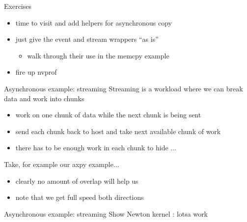 \begin{frame}[fragile]{Exercises}
    \begin{itemize}
        \item time to visit  and add helpers for asynchronous copy
        \item just give the event and stream wrappers ``as is''
        \begin{itemize}
            \item walk through their use in the memcpy example
        \end{itemize}
        \item fire up nvprof
    \end{itemize}
\end{frame}

\begin{frame}[fragile]{Asynchronous example: streaming}
    Streaming is a workload where we can break data and work into chunks
    \begin{itemize}
        \item work on one chunk of data while the next chunk is being sent
        \item send each chunk back to host and take next available chunk of work
        \item there has to be enough work in each chunk to hide ...
    \end{itemize}

    Take, for example our axpy example...
    \begin{itemize}
        \item clearly no amount of overlap will help us
        \item note that we get full speed both directions
    \end{itemize}
\end{frame}

\begin{frame}[fragile]{Asynchronous example: streaming}
    Show Newton kernel : lotsa work
\end{frame}

